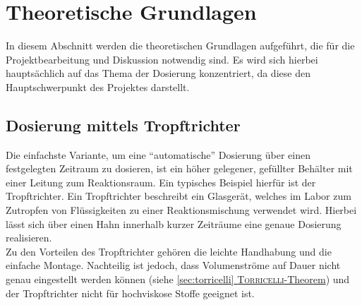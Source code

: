 \section{Theoretische Grundlagen}
\label{sec:physik}
In diesem Abschnitt werden die theoretischen Grundlagen aufgeführt, die für die Projektbearbeitung und Diskussion notwendig sind. Es wird sich hierbei hauptsächlich auf das Thema der Dosierung konzentriert, da diese den Hauptschwerpunkt des Projektes darstellt.

\subsection{Dosierung mittels Tropftrichter}
Die einfachste Variante, um eine "`automatische"' Dosierung über einen festgelegten Zeitraum zu dosieren, ist ein höher gelegener, gefüllter Behälter mit einer Leitung zum Reaktionsraum. Ein typisches Beispiel hierfür ist der Tropftrichter.
Ein Tropftrichter beschreibt ein Glasgerät, welches im Labor zum Zutropfen von Flüssigkeiten zu einer Reaktionsmischung verwendet wird. Hierbei lässt sich über einen Hahn innerhalb kurzer Zeiträume eine genaue Dosierung realisieren. \cite{Hunig.2006}\\ Zu den Vorteilen des Tropftrichter gehören die leichte Handhabung und die einfache Montage. Nachteilig ist jedoch, dass Volumenströme auf Dauer nicht genau eingestellt werden können (siehe \hyperref[sec:torricelli]{\ref{sec:torricelli} \textsc{Torricelli}-Theorem}) und der Tropftrichter nicht für hochviskose Stoffe geeignet ist.

